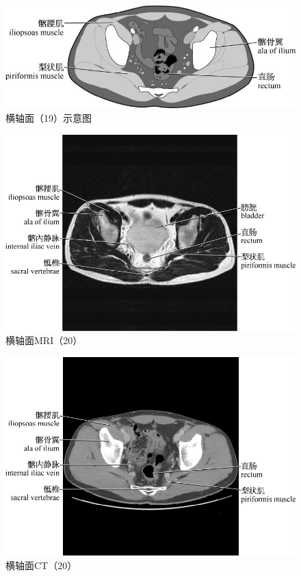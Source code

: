 \begin{figure}[!htbp]
 \centering
 \includegraphics{./images/Image00058.jpg}
 \captionsetup{justification=centering}
 \caption{横轴面（19）示意图}
  \end{figure} 
 \FloatBarrier

\begin{figure}[!htbp]
 \centering
 \includegraphics{./images/Image00059.jpg}
 \captionsetup{justification=centering}
 \caption{横轴面MRI（20）}
  \end{figure} 
 \FloatBarrier

\begin{figure}[!htbp]
 \centering
 \includegraphics{./images/Image00060.jpg}
 \captionsetup{justification=centering}
 \caption{横轴面CT（20）}
  \end{figure} 
 \FloatBarrier


